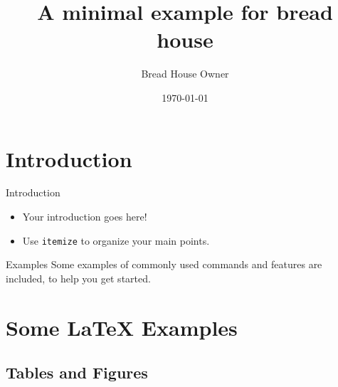 \documentclass{beamer}
\title{A minimal example for bread house}
\date{\today}
\author{Bread House Owner}
\institute{House for Bread}
\begin{document}
\maketitle

\section{Introduction}

\begin{frame}{Introduction}

\begin{itemize}
  \item Your introduction goes here!
  \item Use \texttt{itemize} to organize your main points.
\end{itemize}

\vskip 1cm

\begin{block}{Examples}
Some examples of commonly used commands and features are included, to help you get started.
\end{block}

\end{frame}

\section{Some \LaTeX{} Examples}

\subsection{Tables and Figures}
\end{document}
